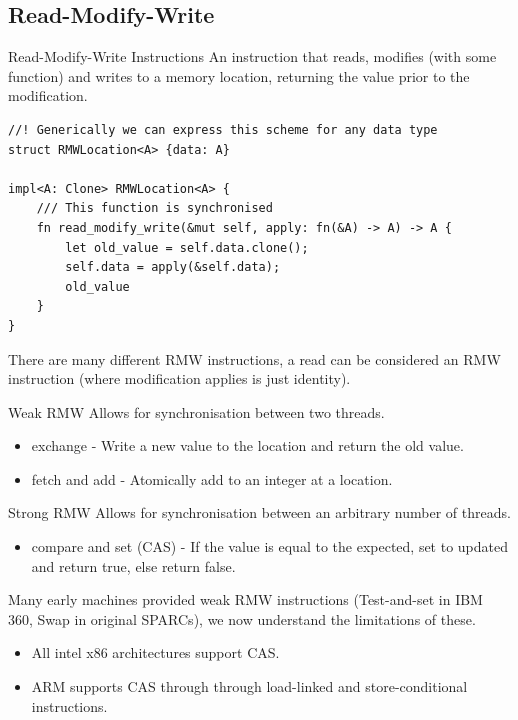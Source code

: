 \subsection{Read-Modify-Write}
\begin{definitionbox}{Read-Modify-Write Instructions}
    An instruction that reads, modifies (with some function) and writes to a memory location, returning the value prior to the modification.
    \begin{verbatim}
//! Generically we can express this scheme for any data type
struct RMWLocation<A> {data: A}

impl<A: Clone> RMWLocation<A> {
    /// This function is synchronised
    fn read_modify_write(&mut self, apply: fn(&A) -> A) -> A {
        let old_value = self.data.clone();
        self.data = apply(&self.data);
        old_value
    }
}
    \end{verbatim}
\end{definitionbox}
There are many different RMW instructions, a read can be considered an RMW instruction (where modification applies is just identity).
\begin{tcbraster}[raster columns=2, raster equal height]
    \begin{definitionbox}{Weak RMW}
        Allows for synchronisation between two threads.
        \begin{itemize}
            \item exchange - Write a new value to the location and return the old value.
            \item fetch and add - Atomically add to an integer at a location. \\
        \end{itemize}
    \end{definitionbox}
    \begin{definitionbox}{Strong RMW}
        Allows for synchronisation between an arbitrary number of threads.
        \begin{itemize}
            \item compare and set (CAS) - If the value is equal to the expected, set to updated and return true, else return false.
        \end{itemize}
    \end{definitionbox}
\end{tcbraster}
Many early machines provided weak RMW instructions (Test-and-set in IBM 360, Swap in original SPARCs), we now understand the limitations of these.
\begin{itemize}
    \item All intel x86 architectures support CAS.
    \item ARM supports CAS through through load-linked and store-conditional instructions.
\end{itemize}

